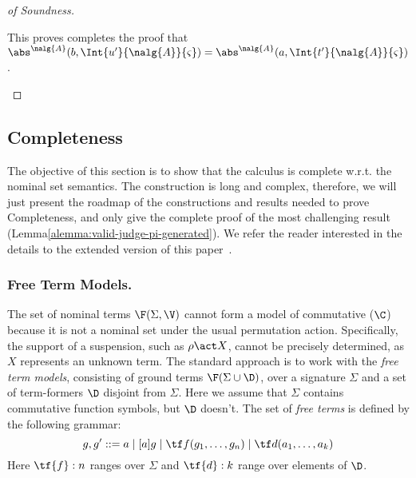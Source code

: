 \begin{proof}[of Soundness]
\begin{itemize}
             This proves completes the proof that $\abs^{\nalg{A}}(b,\Int{u'}{\nalg{A}}{\varsigma}) =  \abs^{\nalg{A}}(a,\Int{t'}{\nalg{A}}{\varsigma})$.

                \end{itemize}
\end{proof}

\subsection{Completeness}\label{app:completeness}

The objective of this section is to show that the calculus is complete w.r.t. the nominal set semantics. The construction is long and complex, therefore, we will just present the roadmap of the constructions and results needed to prove Completeness, and only give the complete proof of the most challenging result (Lemma\ref{alemma:valid-judge-pi-generated}). We refer the reader interested in the details to the extended version of this paper~\cite{arxiv/cairessantos2025}.




\subsubsection*{Free Term Models.}\label{app:free-models}
The set of nominal terms $\F(\Sigma, \V)$ cannot form a model of commutative ($\C$) because it is not a nominal set under the usual permutation action. Specifically, the support of a suspension, such as $\rho \act X$, cannot be precisely determined, as $X$ represents an unknown term. The standard approach is to work with the {\em free term models}, consisting of ground terms $\F(\Sigma\cup \D)$, over a signature $\Sigma$ and a set of term-formers $\D$ disjoint from $\Sigma$.  Here we assume that $\Sigma$ contains commutative function symbols, but $\D$ doesn't. The set of {\em free terms} is defined by the following grammar:
\[ g,g' ::=  a \mid [a]g \mid {\tf f} (g_1,\ldots, g_n) \mid {\tf d}(a_1,\ldots, a_k)\]
Here $\tf{f}:n$ ranges over $\Sigma$ and $\tf{d}:k$ range over elements of $\D$.

